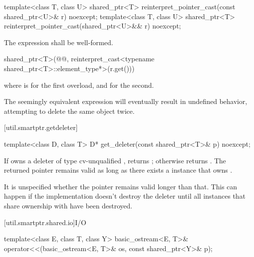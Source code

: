 %
\begin{itemdecl}
template<class T, class U>
  shared_ptr<T> reinterpret_pointer_cast(const shared_ptr<U>& r) noexcept;
template<class T, class U>
  shared_ptr<T> reinterpret_pointer_cast(shared_ptr<U>&& r) noexcept;
\end{itemdecl}

\begin{itemdescr}
\pnum
\requires The expression 
shall be well-formed.

\pnum\returns
\begin{codeblock}
shared_ptr<T>(@@, reinterpret_cast<typename shared_ptr<T>::element_type*>(r.get()))
\end{codeblock}
where  is  for the first overload, and
 for the second.

\pnum
\begin{note}
The seemingly equivalent expression
 will eventually result in
undefined behavior, attempting to delete the same object twice.
\end{note}
\end{itemdescr}

[util.smartptr.getdeleter]{}

%
\begin{itemdecl}
template<class D, class T>
  D* get_deleter(const shared_ptr<T>& p) noexcept;
\end{itemdecl}

\begin{itemdescr}
\pnum\returns  If  owns a deleter  of type cv-unqualified
, returns ; otherwise returns .
The returned
pointer remains valid as long as there exists a  instance
that owns . \begin{note} It is unspecified whether the pointer
remains valid longer than that. This can happen if the implementation doesn't destroy
the deleter until all  instances that share ownership with
 have been destroyed. \end{note}
\end{itemdescr}

[util.smartptr.shared.io]{I/O}

%
\begin{itemdecl}
template<class E, class T, class Y>
  basic_ostream<E, T>& operator<<(basic_ostream<E, T>& os, const shared_ptr<Y>& p);
\end{itemdecl}

